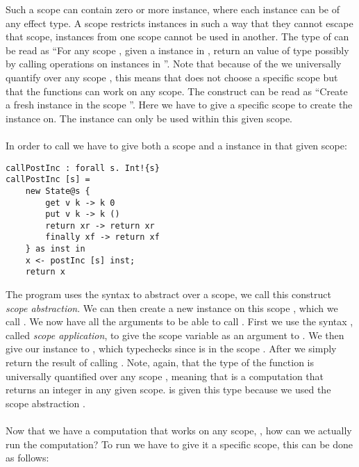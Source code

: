 Such a scope can contain zero or more instance, where each instance can be of any effect type.
A scope restricts instances in such a way that they cannot escape that scope, instances from one scope cannot be used in another.
The type of  can be read as ``For any scope , given a  instance in , return an value of type  possibly by calling operations on instances in ''. Note that because of the  we universally quantify over any scope , this means that  does not choose a specific scope but that the functions can work on any scope. The construct  can be read as ``Create a fresh  instance in the scope ''. Here we have to give a specific scope  to create the instance on. The instance can only be used within this given scope.
\\\\
In order to call  we have to give both a scope and a  instance in that given scope:
\begin{verbatim}
callPostInc : forall s. Int!{s}
callPostInc [s] =
	new State@s {
		get v k -> k 0
		put v k -> k ()
		return xr -> return xr
		finally xf -> return xf
	} as inst in
	x <- postInc [s] inst;
	return x
\end{verbatim}

The program  uses the syntax \ident{/\s ->} to abstract over a scope, we call this construct \emph{scope abstraction}.
We can then create a new  instance on this scope , which we call .
We now have all the arguments to be able to call .
First we use the syntax , called \emph{scope application}, to give the scope variable as an argument to .
We then give our instance  to , which typechecks since  is in the scope .
After we simply return the result of calling .
Note, again, that the type of the function is universally quantified over any scope ,
meaning that  is a computation that returns an integer in any given scope.
 is given this  type because we used the scope abstraction \ident{/\s ->}.
\\\\
Now that we have a computation that works on any scope, , how can we actually run the computation?
To run  we have to give it a specific scope, this can be done as follows:

